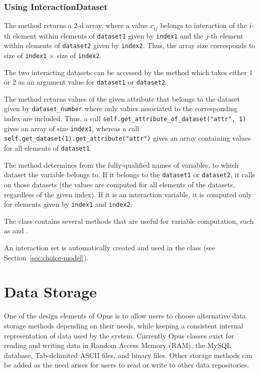 {\subsubsection{Using InteractionDataset}
%
The method  \attributesindex returns a 2-d array, where a value
$x_{ij}$ belongs to interaction of the $i$-th element within elements of
\verb|dataset1| given by \verb|index1| and the $j$-th element within
elements of \verb|dataset2| given by \verb|index2|. Thus, the array size
corresponds to size of \verb|index1| $\times$ size of \verb|index2|.

The two interacting datasets \datasetindex can be accessed by the method
 which takes either 1 or 2 as an argument value for
\verb|dataset1| or \verb|dataset2|.

The method  returns values of
the given attribute \attributesindex that belongs to the dataset given by  \verb|dataset_number| where
only values associated to the corresponding index are included. Thus, a
call \verb|self.get_attribute_of_dataset("attr", 1)| \attributesindex gives an array of size
\verb|index1|, whereas a call \verb|self.get_dataset(1).get_attribute("attr")| \attributesindex
gives an array containing values for all elements of \verb|dataset1|.

The method  \variablesindex determines from the fully-qualified
names of variables, \variablesindex to which dataset the variable \variablesindex belongs to. If it belongs to
the \verb|dataset1| or \verb|dataset2|, it calls  \variablesindex on
those datasets (the values are computed for all elements of the datasets,
regardless of the given index). If it is an interaction variable, \variablesindex it is
computed only for elements given by \verb|index1| and \verb|index2|.

The  class contains several methods that are useful for
variable \variablesindex computation, such as  and .

An interaction set is automatically created and used in the
 class (see Section~\ref{sec:choice-model}).

\section{Data Storage}
\label{sec:data-storage}
%
One of the design elements of Opus is to allow users to choose alternative
data storage methods depending on their needs, while keeping a consistent
internal representation of data used by the system.  Currently Opus classes
exist for reading and writing data in Random Access Memory (RAM), the MySQL
database, Tab-delimited ASCII files, and binary files.  Other storage methods
can be added as the need arises for users to read or write to other data
repositories.

}
